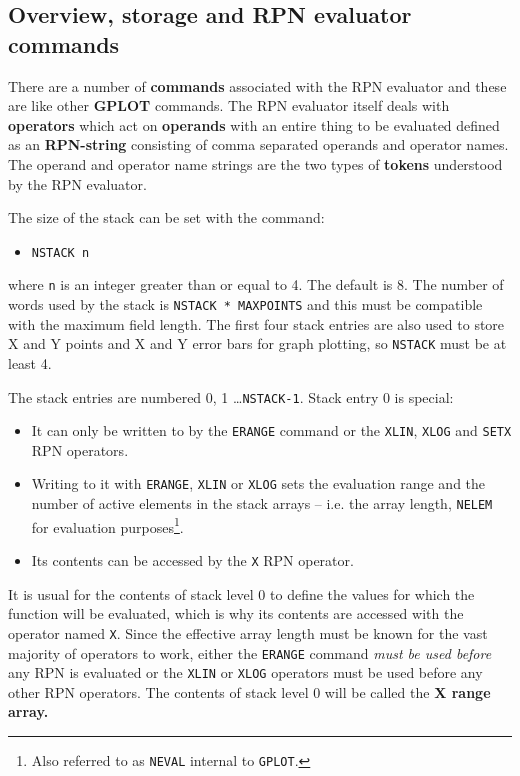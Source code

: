 \documentclass[a4paper,twoside,11pt]{article}
\newcommand{\newpara}{\par\vspace{4mm}\noindent}
\newcommand{\textttc}[1]{\texttt{\textcolor{OurRed}{#1}}}
\begin{document}
\subsection{Overview, storage and RPN evaluator commands}
There are a number of \textbf{commands} associated with the RPN evaluator and these are like other \textbf{GPLOT} commands.
The RPN evaluator itself deals with \textbf{operators} which act on \textbf{operands} with an entire thing to be evaluated defined
as an \textbf{RPN-string} consisting of comma separated operands and operator names. The operand and operator name strings are
the two types of \textbf{tokens} understood by the RPN evaluator. 
\newpara
The size of the stack can be set with the command:
\begin{itemize}
\item \textttc{NSTACK n}
\end{itemize}
where \texttt{n} is an integer greater than or equal to 4. The default is 8. The number of words used by the stack is 
\texttt{NSTACK * MAXPOINTS}
and this must be compatible with the maximum field length. The first four stack entries are also used to store X and Y points 
and X and Y error bars for graph plotting, so \texttt{NSTACK} must be at least 4.
\newpara
The stack entries are numbered 0, 1 \ldots \texttt{NSTACK-1}. Stack entry 0 is special:
\begin{itemize}
\item It can only be written to by the \textttc{ERANGE} command or the \textttc{XLIN}, \textttc{XLOG} and \textttc{SETX} 
RPN operators.
\item Writing to it with \textttc{ERANGE}, \textttc{XLIN} or \textttc{XLOG} sets the evaluation range and the number of active elements in
the stack arrays -- i.e. the array length, \texttt{NELEM} for evaluation purposes\footnote{Also referred to as
\texttt{NEVAL} internal to \texttt{GPLOT}.}.
\item Its contents can be accessed by the \textttc{X} RPN operator.
\end{itemize}
It is usual for the contents of stack level 0 to define the values for which the function will be evaluated, which is why its contents
are accessed with the operator named \textttc{X}. Since the effective array length must be known for the vast majority of operators to
work, either the \textttc{ERANGE} command \emph{must be used before} any RPN is evaluated or the \textttc{XLIN} or \textttc{XLOG} 
operators must be used before any other RPN operators. The contents of stack level 0 will be called the \textbf{X range array.}
\end{document}
